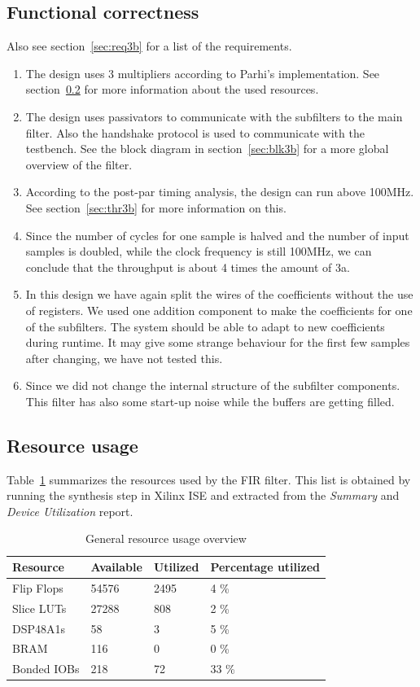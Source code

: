 \documentclass[a4paper,twoside,11pt, fleqn]{article}
\begin{document}
\subsection{Functional correctness}
Also see section~\ref{sec:req3b} for a list of the requirements.
\begin{enumerate}
\item The design uses 3 multipliers according to Parhi's implementation. See section~\ref{sec:resc3b} for more information about the used resources. 
\item The design uses passivators to communicate with the subfilters to the main filter. Also the handshake protocol is used to communicate with the testbench. See the block diagram in section~\ref{sec:blk3b} for a more global overview of the filter. 
\item According to the post-par timing analysis, the design can run above 100MHz. See section~\ref{sec:thr3b} for more information on this.
\item Since the number of cycles for one sample is halved and the number of input samples is doubled, while the clock frequency is still 100MHz, we can conclude that the throughput is about 4 times the amount of 3a.
\item In this design we have again split the wires of the coefficients without the use of registers. We used one addition component to make the coefficients for one of the subfilters. The system should be able to adapt to new coefficients during runtime. It may give some strange behaviour for the first few samples after changing, we have not tested this.
\item Since we did not change the internal structure of the subfilter components. This filter has also some start-up noise while the buffers are getting filled.
\end{enumerate}

\subsection{Resource usage}
\label{sec:resc3b}

Table~\ref{tab:3busage} summarizes the resources used by the FIR filter. This list is obtained by running the synthesis step in Xilinx ISE and extracted from the \textit{Summary} and \textit{Device Utilization} report.

\begin{table}[h]
\begin{tabular}{|l|l|l|l|}
\hline
\textbf{Resource} & \textbf{Available} & \textbf{Utilized} & \textbf{Percentage utilized}\\
\hline
Flip Flops	& 54576 & 2495 	& 4 \%\\
Slice LUTs 	& 27288 & 808 	& 2 \%\\
DSP48A1s	& 58 	& 3 	& 5 \%\\
BRAM		& 116 	& 0 	& 0 \%\\
Bonded IOBs	& 218 	& 72 	& 33 \%\\
\hline
\end{tabular}
\caption{General resource usage overview}
\label{tab:3busage}
\end{table}
\end{document}
